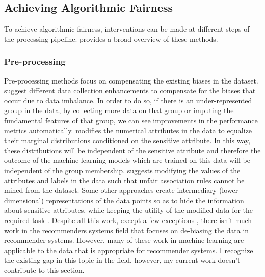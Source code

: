 
\subsection{Achieving Algorithmic Fairness}
To achieve algorithmic fairness, interventions can be made at different steps of the processing pipeline. \cite{Friedler2019} provides a broad overview of these methods.

\subsubsection{Pre-processing}
Pre-processing methods focus on compensating the existing biases in the dataset. \cite{chen2018why} suggest different data collection enhancements to compensate for the biases that occur due to data imbalance. In order to do so, if there is an under-represented group in the data, by collecting more data on that group or imputing the fundamental features of that group, we can see improvements in the performance metrics automatically. \cite{Feldman2015} modifies the numerical attributes in the data to equalize their marginal distributions conditioned on the sensitive attribute. In this way, these distributions will be independent of the sensitive attribute and therefore the outcome of the machine learning models which are trained on this data will be independent of the group membership. \cite{hajian2012methodology} suggests modifying the values of the attributes and labels in the data such that unfair association rules cannot be mined from the dataset. Some other approaches create intermediary (lower-dimensional) representations of the data points so as to hide the information about sensitive attributes, while keeping the utility
of the modified data for the required task \cite{zemel2013learning,lahoti2019ifair}. 
Despite all this work, except a few exceptions \cite{ekstrand2018all}, there isn't much work in the recommenders systems field that focuses on de-biasing the data in recommender systems. However, many of these work in machine learning are applicable to the data that is appropriate for recommender systems. 
I recognize the existing gap in this topic in the field, however, my current work doesn't contribute to this section.


